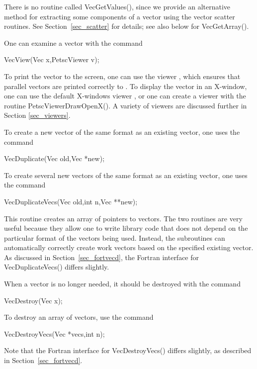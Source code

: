 There is no routine called VecGetValues(), since we provide 
an alternative method for extracting some components of a vector using
the vector scatter routines.  See Section~\ref{sec_scatter} for details; see also
below for VecGetArray().

One can examine a vector with the command 
\begin{tabbing}
  VecView(Vec x,PetscViewer v);
\end{tabbing}
To print the vector to the screen, one can use the viewer
 ,
which ensures that parallel vectors are printed correctly to
. To display the vector in an X-window, one can use the
default X-windows viewer ,
 or one can create a viewer with the
routine PetscViewerDrawOpenX().  A variety of viewers are discussed
further in Section \ref{sec_viewers}.

To create a new vector of the same format as an existing vector, one uses
the command 
\begin{tabbing}
  VecDuplicate(Vec old,Vec *new);
\end{tabbing}
To create several new vectors of the same format as an existing vector,
one uses the command 
\begin{tabbing}
  VecDuplicateVecs(Vec old,int n,Vec **new);
\end{tabbing}
This routine creates an array of pointers to vectors. The two routines 
are very useful because they allow one to write library code that does 
not depend on the particular format of the vectors being used. Instead,
the subroutines can automatically correctly create work vectors
based on the specified existing vector.  As discussed in 
Section~\ref{sec_fortvecd}, the Fortran interface for VecDuplicateVecs()
differs slightly.

When a vector is no longer needed, it should be destroyed with the 
command 
\begin{tabbing}
  VecDestroy(Vec x);
\end{tabbing}
To destroy an array of vectors, use the command 
\begin{tabbing}
  VecDestroyVecs(Vec *vecs,int n);
\end{tabbing}
Note that the Fortran interface for VecDestroyVecs() differs slightly,
as described in Section~\ref{sec_fortvecd}.

